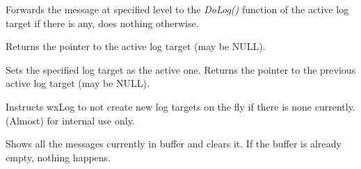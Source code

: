 \\
\\
\\
\\
\\


\label{wxlogonlog}


Forwards the message at specified level to the {\it DoLog()} function of the
active log target if there is any, does nothing otherwise.

\label{wxloggetactivetarget}


Returns the pointer to the active log target (may be NULL).

\label{wxlogsetactivetarget}


Sets the specified log target as the active one. Returns the pointer to the
previous active log target (may be NULL).

\label{wxlogdontcreateondemand}


Instructs wxLog to not create new log targets on the fly if there is none
currently. (Almost) for internal use only.

\label{wxlogflush}


Shows all the messages currently in buffer and clears it. If the buffer
is already empty, nothing happens.

\label{haspendingmessages}


